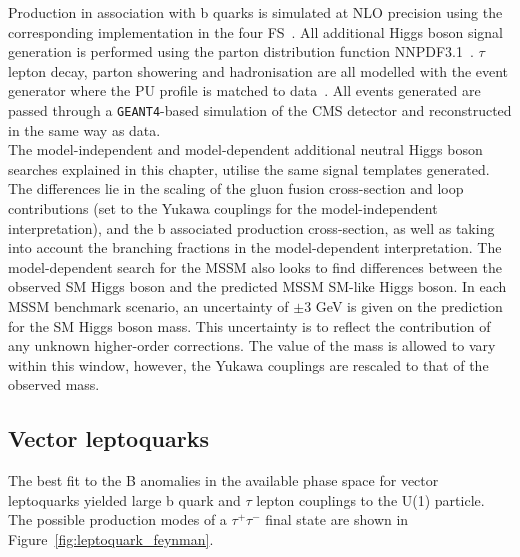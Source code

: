 Production in association with b quarks is simulated at \ac{NLO} precision using the corresponding  implementation in the four \ac{FS}~\cite{Nason:2004rx,Frixione:2007vw,Alioli:2010xd,Jezo:2015aia}.
All additional Higgs boson signal generation is performed using the parton distribution function NNPDF3.1~\cite{Ball:2014uwa,Ball:2017nwa}.
$\tau$ lepton decay, parton showering and hadronisation are all modelled with the \PYTHIA event generator where the \ac{PU} profile is matched to data~\cite{Sirunyan:2019dfx,Sjostrand:2014zea}.
All events generated are passed through a \texttt{GEANT4}-based \cite{Agostinelli:2002hh} simulation of the \ac{CMS} detector and reconstructed in the same way as data. \\

The model-independent and model-dependent additional neutral Higgs boson searches explained in this chapter, utilise the same signal templates generated. 
The differences lie in the scaling of the gluon fusion cross-section and loop contributions (set to the Yukawa couplings for the model-independent interpretation), and the b associated production cross-section, as well as taking into account the branching fractions in the model-dependent interpretation.
The model-dependent search for the \ac{MSSM} also looks to find differences between the observed \ac{SM} Higgs boson and the predicted \ac{MSSM} \ac{SM}-like Higgs boson.
In each \ac{MSSM} benchmark scenario, an uncertainty of $\pm 3$ GeV is given on the prediction for the \ac{SM} Higgs boson mass.
This uncertainty is to reflect the contribution of any unknown higher-order corrections.
The value of the mass is allowed to vary within this window, however, the Yukawa couplings are rescaled to that of the observed mass.

\subsection{Vector leptoquarks}
\label{sec:vlq}

The best fit to the B anomalies in the available phase space for vector leptoquarks yielded large b quark and $\tau$ lepton couplings to the U(1) particle.
The possible production modes of a $\tau^+\tau^-$ final state are shown in Figure~\ref{fig:leptoquark_feynman}. \\

